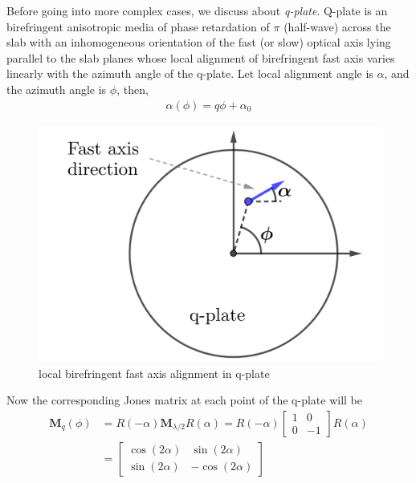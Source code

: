 \documentclass[11pt,a4paper]{article}
\numberwithin{equation}{section}
\begin{document}
Before going into more complex cases, we discuss about \textit{q-plate}. Q-plate is an birefringent anisotropic media of phase retardation of $\pi$ (half-wave) across the slab with an inhomogeneous orientation of the fast (or slow) optical axis lying parallel to the slab planes whose local alignment of birefringent fast axis varies linearly with the azimuth angle of the q-plate.\cite{marrucci 06} Let local alignment angle is $\alpha$, and the azimuth angle is $\phi$, then,
\begin{align}
	\alpha(\phi)=q\phi+\alpha_0
\end{align}
\begin{figure}[H]
\centering
\includegraphics[width=0.4\linewidth]{q-plate}
\caption{local birefringent fast axis alignment in q-plate}
\label{fig:q-plate}
\end{figure}

Now the corresponding Jones matrix at each point of the q-plate will be \cite{marrucci 06}
\begin{align}
	\boldsymbol{M}_q(\phi)&=R(-\alpha)\boldsymbol{M}_{\lambda/2}R(\alpha) 
	=R(-\alpha)
	\begin{bmatrix}
		1 & 0\\
		0 & -1
	\end{bmatrix}
	R(\alpha)\nonumber\\
	 &=\begin{bmatrix}
		\cos(2\alpha) & \sin(2\alpha)\\
		\sin(2\alpha) & -\cos(2\alpha)
	\end{bmatrix}
\end{align}
\end{document}

